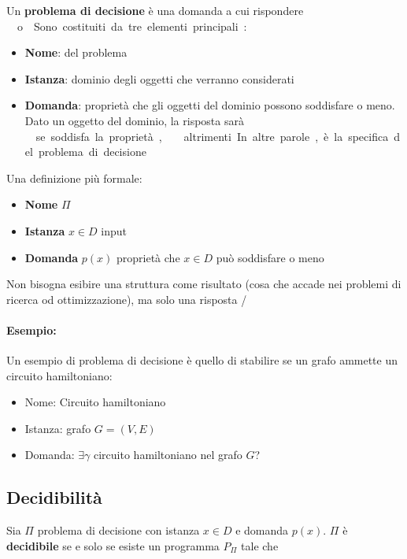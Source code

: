 Un \textbf{problema di decisione} è una domanda a cui rispondere \si\ o \no. Sono costituiti da tre elementi principali: 
\begin{itemize}
	\item \textbf{Nome}: del problema
	\item \textbf{Istanza}: dominio degli oggetti che verranno considerati
	\item \textbf{Domanda}: proprietà che gli oggetti del dominio possono soddisfare o meno. Dato un oggetto del dominio, la risposta sarà \si\ se soddisfa la proprietà, \no\ altrimenti. In altre parole, è la specifica del problema di decisione
\end{itemize}

Una definizione più formale: 
\begin{itemize}
	\item \textbf{Nome} $\Pi$
	\item \textbf{Istanza} $x \in D$ input
	\item \textbf{Domanda} $p(x)$ proprietà che $x \in D$ può soddisfare o meno
\end{itemize}

Non bisogna esibire una struttura come risultato (cosa che accade nei problemi di ricerca od ottimizzazione), ma solo una risposta \si/\no.\\

\paragraph{Esempio:} Un esempio di problema di decisione è quello di stabilire se un grafo ammette un circuito hamiltoniano:
\begin{itemize}
	\item Nome: Circuito hamiltoniano
	\item Istanza: grafo $G = (V,E)$
	\item Domanda: $\exists \gamma$ circuito hamiltoniano nel grafo $G$?
\end{itemize}

\subsection{Decidibilità}

Sia $\Pi$ problema di decisione con istanza $x \in D$ e domanda $p(x)$. $\Pi$ è \textbf{decidibile} se e solo se esiste un programma $P_\Pi$ tale che
\begin{center}
	
\end{center}

